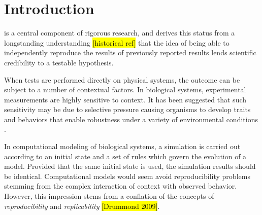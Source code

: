 \documentclass[journal,transmag]{IEEEtran}
\begin{document}
%
\IEEEpeerreviewmaketitle



\section{Introduction}
% 
% 
% 
% 
 is a central component of rigorous
research, and derives this status from a longstanding understanding \hl{[historical ref]}
that the idea of being able to independently reproduce the results of
previously reported results lends scientific credibility to
a testable hypothesis.

When tests are performed directly on physical systems, the outcome can be subject to a
number of contextual factors. In biological systems, experimental measurements are highly
sensitive to context. It has been suggested that such sensitivity may be due to selective
pressure causing organisms to develop traits and behaviors that enable robustness under
a variety of environmental conditions \cite{ArkinContext12}.

In computational modeling of biological systems, a simulation is carried out according
to an initial state and a set of rules which govern the evolution of a model.
Provided that the same initial state is used, the simulation results should be identical.
Computational models would seem avoid reproducibility
problems stemming from the complex interaction of context with observed behavior.
However, this impression stems from a conflation of the concepts of \textit{reproducibility}
and \textit{replicability} \hl{[Drummond 2009]}.
\end{document}
